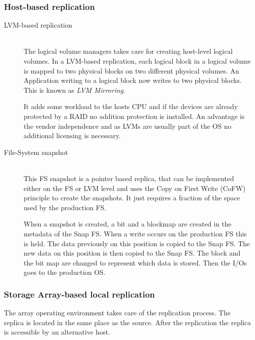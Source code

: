 	\subsubsection{Host-based replication} %
	\label{ssub:host_based_replication}
		\begin{description}
			\item[LVM-based replication] \hfill \\
				The logical volume managers takes care for creating host-level logical volumes.
				In a LVM-based replication,
				each logical block in a logical volume is mapped to two physical blocks
				on two different physical volumes.
				An Application writing to a logical block now writes to two physical blocks.
				This is known as \emph{LVM Mirroring}.

				It adds some workload to the hosts CPU
				and if the devices are already protected by a RAID
				no addition protection is installed.
				An advantage is the vendor independence
				and as LVMs are usually part of the OS no additional licensing is necessary.
			\item[File-System snapshot] \hfill \\
				This FS snapshot is a pointer based replica,
				that can be implemented either on the FS or LVM level
				and uses the Copy on First Write (CoFW) principle to create the snapshots.
				It just requires a fraction of the space used by the production FS.

				When a snapshot is created,
				a bit and a blockmap are created in the metadata of the Snap FS.
				When a write occurs on the production FS this is held.
				The data previously on this position is copied to the Snap FS.
				The new data on this position is then copied to the Snap FS.
				The block and the bit map are changed to represent which data is stored.
				Then the I/Os goes to the production OS.
		\end{description}

	\subsubsection{Storage Array-based local replication} %
	\label{ssub:storage_array_based_local_replication}
		The array operating environment takes care of the replication process.
		The replica is located in the same place as the source.
		After the replication the replica is accessible by an alternative host.

